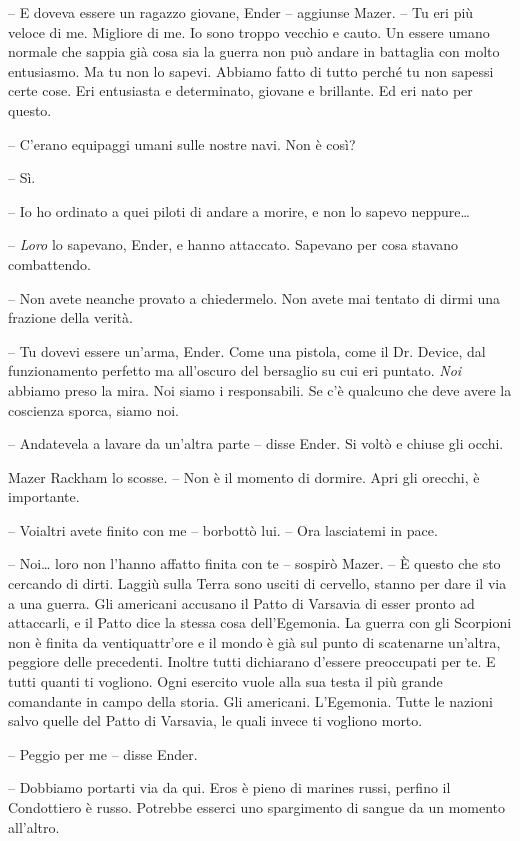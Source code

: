 {-- E doveva essere un ragazzo giovane, Ender -- aggiunse Mazer. -- Tu
	eri più veloce di me. Migliore di me. Io sono troppo vecchio e cauto. Un
	essere umano normale che sappia già cosa sia la guerra non può andare in
	battaglia con molto entusiasmo. Ma tu non lo sapevi. Abbiamo fatto di
	tutto perché tu non sapessi certe cose. Eri entusiasta e determinato,
	giovane e brillante. Ed eri nato per questo.}

{-- C'erano equipaggi umani sulle nostre navi. Non è così?}

{-- Sì.}

{-- Io ho ordinato a quei piloti di andare a morire, e non lo sapevo
	neppure\ldots{}}

{-- \emph{Loro} lo sapevano, Ender, e hanno attaccato. Sapevano per cosa
	stavano combattendo.}

{-- Non avete neanche provato a chiedermelo. Non avete mai tentato di
	dirmi una frazione della verità.}

{-- Tu dovevi essere un'arma, Ender. Come una pistola, come il Dr.
	Device, dal funzionamento perfetto ma all'oscuro del bersaglio su cui
	eri puntato. \emph{Noi} abbiamo preso la mira. Noi siamo i responsabili.
	Se c'è qualcuno che deve avere la coscienza sporca, siamo noi.}

{-- Andatevela a lavare da un'altra parte -- disse Ender. Si voltò e
	chiuse gli occhi.}

{Mazer Rackham lo scosse. -- Non è il momento di dormire. Apri gli
	orecchi, è importante.}

{-- Voialtri avete finito con me -- borbottò lui. -- Ora lasciatemi in
	pace.}

{-- Noi\ldots{} loro non l'hanno affatto finita con te -- sospirò Mazer.
	-- È questo che sto cercando di dirti. Laggiù sulla Terra sono usciti di
	cervello, stanno per dare il via a una guerra. Gli americani accusano il
	Patto di Varsavia di esser pronto ad attaccarli, e il Patto dice la
	stessa cosa dell'Egemonia. La guerra con gli Scorpioni non è finita da
	ventiquattr'ore e il mondo è già sul punto di scatenarne un'altra,
	peggiore delle precedenti. Inoltre tutti dichiarano d'essere preoccupati
	per te. E tutti quanti ti vogliono. Ogni esercito vuole alla sua testa
	il più grande comandante in campo della storia. Gli americani.
	L'Egemonia. Tutte le nazioni salvo quelle del Patto di Varsavia, le
	quali invece ti vogliono morto.}

{-- Peggio per me -- disse Ender.}

{-- Dobbiamo portarti via da qui. Eros è pieno di marines russi, perfino
	il Condottiero è russo. Potrebbe esserci uno spargimento di sangue da un
	momento all'altro.}

